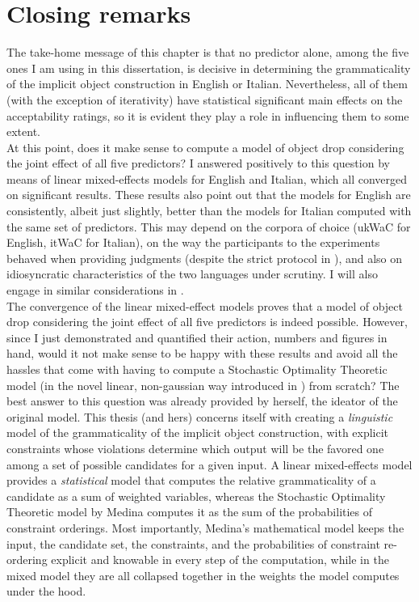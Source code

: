 \section{Closing remarks} 

The take-home message of this chapter is that no predictor alone, among the five ones I am using in this dissertation, is decisive in determining the grammaticality of the implicit object construction in English or Italian. Nevertheless, all of them (with the exception of iterativity) have statistical significant main effects on the acceptability ratings, so it is evident they play a role in influencing them to some extent.\\
At this point, does it make sense to compute a model of object drop considering the joint effect of all five predictors? I answered positively to this question by means of linear mixed-effects models for English and Italian, which all converged on significant results. These results also point out that the models for English are consistently, albeit just slightly, better than the models for Italian computed with the same set of predictors. This may depend on the corpora of choice (ukWaC for English, itWaC for Italian), on the way the participants to the experiments behaved when providing judgments (despite the strict protocol in ), and also on idiosyncratic characteristics of the two languages under scrutiny. I will also engage in similar considerations in .\\
The convergence of the linear mixed-effect models proves that a model of object drop considering the joint effect of all five predictors is indeed possible. However, since I just demonstrated and quantified their action, numbers and figures in hand, would it not make sense to be happy with these results and avoid all the hassles that come with having to compute a Stochastic Optimality Theoretic model (in the novel linear, non-gaussian way introduced in ) from scratch? The best answer to this question was already provided by \textcite{Medina2007} herself, the ideator of the original model. This thesis (and hers) concerns itself with creating a \textit{linguistic} model of the grammaticality of the implicit object construction, with explicit constraints whose violations determine which output will be the favored one among a set of possible candidates for a given input. A linear mixed-effects model provides a \textit{statistical} model that computes the relative grammaticality of a candidate as a sum of weighted variables, whereas the Stochastic Optimality Theoretic model by Medina computes it as the sum of the probabilities of constraint orderings. Most importantly, Medina's mathematical model keeps the input, the candidate set, the constraints, and the probabilities of constraint re-ordering explicit and knowable in every step of the computation, while in the mixed model they are all collapsed together in the weights the model computes under the hood.



